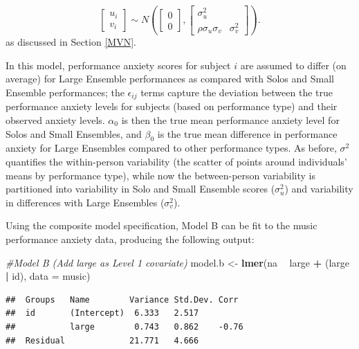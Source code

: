 \documentclass[
]{krantz}
\newenvironment{Shaded}{\begin{snugshade}}{\end{snugshade}}
\newcommand{\CommentTok}[1]{\textcolor[rgb]{0.37,0.37,0.37}{\textit{#1}}}
\newcommand{\DataTypeTok}[1]{\textcolor[rgb]{0.27,0.27,0.27}{#1}}
\newcommand{\KeywordTok}[1]{\textcolor[rgb]{0.27,0.27,0.27}{\textbf{#1}}}
\newcommand{\NormalTok}[1]{#1}
\newcommand{\OperatorTok}[1]{\textcolor[rgb]{0.43,0.43,0.43}{\textbf{#1}}}
\newcommand{\StringTok}[1]{\textcolor[rgb]{0.5,0.5,0.5}{#1}}
\begin{document}
\[ \left[ \begin{array}{c}
            u_{i} \\ v_{i}
          \end{array}  \right] \sim N \left( \left[
          \begin{array}{c}
            0 \\ 0
          \end{array} \right], \left[
          \begin{array}{cc}
            \sigma_{u}^{2} & \\
            \rho\sigma_{u}\sigma_{v} & \sigma_{v}^{2}
          \end{array} \right] \right). \]
as discussed in Section \ref{MVN}.

In this model, performance anxiety scores for subject \(i\) are assumed to differ (on average) for Large Ensemble performances as compared with Solos and Small Ensemble performances; the \(\epsilon_{ij}\) terms capture the deviation between the true performance anxiety levels for subjects (based on performance type) and their observed anxiety levels. \(\alpha_{0}\) is then the true mean performance anxiety level for Solos and Small Ensembles, and \(\beta_{0}\) is the true mean difference in performance anxiety for Large Ensembles compared to other performance types. As before, \(\sigma^2\) quantifies the within-person variability (the scatter of points around individuals' means by performance type), while now the between-person variability is partitioned into variability in Solo and Small Ensemble scores (\(\sigma_{u}^{2}\)) and variability in differences with Large Ensembles (\(\sigma_{v}^{2}\)).

Using the composite model specification, Model B can be fit to the music performance anxiety data, producing the following output:

\begin{Shaded}
\begin{Highlighting}[]
\CommentTok{#Model B (Add large as Level 1 covariate)}
\NormalTok{model.b <-}\StringTok{ }\KeywordTok{lmer}\NormalTok{(na }\OperatorTok{~}\StringTok{ }\NormalTok{large }\OperatorTok{+}\StringTok{  }\NormalTok{(large }\OperatorTok{|}\StringTok{ }\NormalTok{id), }\DataTypeTok{data =}\NormalTok{ music)}
\end{Highlighting}
\end{Shaded}

\begin{verbatim}
##  Groups   Name        Variance Std.Dev. Corr 
##  id       (Intercept)  6.333   2.517         
##           large        0.743   0.862    -0.76
##  Residual             21.771   4.666
\end{verbatim}
\end{document}
